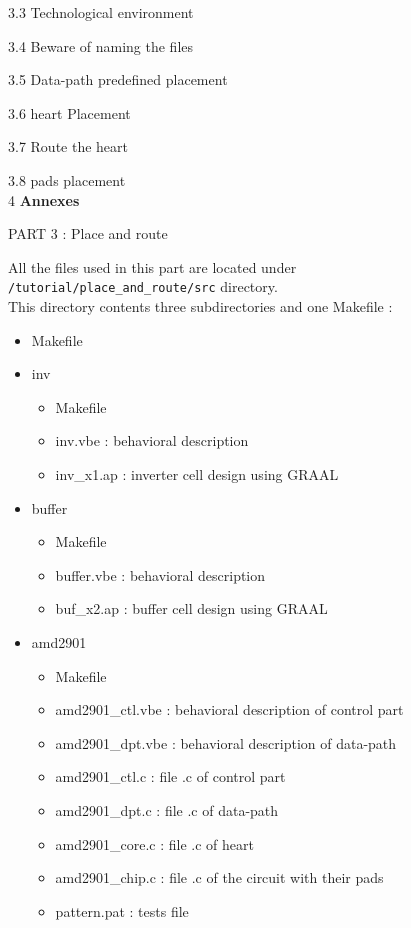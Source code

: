 \documentclass{article}
\begin{document}
{3.3} Technological environment

{3.4} Beware of naming the files

{3.5} Data-path predefined placement

{3.6} heart Placement

{3.7} Route the heart

{3.8} pads placement
\\
{4} {\bf Annexes} 
 
\newpage
       {\huge
        PART 3 : }
        \vspace{1cm}
        {\huge
        Place and route
        }
 
All the files used in this part are located under \\
\texttt{/tutorial/place\_and\_route/src} directory.\\
This directory contents three subdirectories and one Makefile :

\begin{itemize}\itemsep=-.8ex

\item   Makefile
\item   inv
    \begin{itemize}\itemsep=-.8ex
    \item   Makefile
    \item   inv.vbe    : behavioral description 
    \item   inv\_x1.ap : inverter cell design using GRAAL
    \end{itemize}
\item   buffer
    \begin{itemize}\itemsep=-.8ex
    \item   Makefile
    \item   buffer.vbe : behavioral description
    \item   buf\_x2.ap : buffer cell design using GRAAL
    \end{itemize}
\item  amd2901 
    \begin{itemize}\itemsep=-.8ex
    \item   Makefile
    \item   amd2901\_ctl.vbe : behavioral description of control
    part
    \item   amd2901\_dpt.vbe : behavioral description of data-path
    \item   amd2901\_ctl.c : file .c of control part
    \item   amd2901\_dpt.c : file .c of data-path
    \item   amd2901\_core.c : file .c of heart
    \item   amd2901\_chip.c : file .c of the circuit with their
    pads
    \item   pattern.pat : tests file
    \end{itemize}
\end{itemize}
\end{document}
